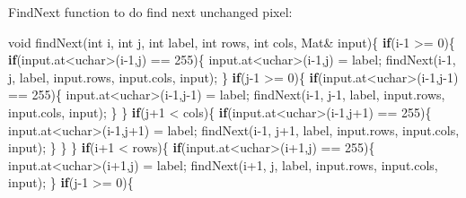 \documentclass[]{article}
\newenvironment{Shaded}{\begin{snugshade}}{\end{snugshade}}
\newcommand{\KeywordTok}[1]{\textcolor[rgb]{0.13,0.29,0.53}{\textbf{{#1}}}}
\newcommand{\DataTypeTok}[1]{\textcolor[rgb]{0.13,0.29,0.53}{{#1}}}
\newcommand{\DecValTok}[1]{\textcolor[rgb]{0.00,0.00,0.81}{{#1}}}
\newcommand{\NormalTok}[1]{{#1}}
\begin{document}
FindNext function to do find next unchanged pixel:

\begin{Shaded}
\begin{Highlighting}[]
\DataTypeTok{void} \NormalTok{findNext(}\DataTypeTok{int} \NormalTok{i, }\DataTypeTok{int} \NormalTok{j, }\DataTypeTok{int} \NormalTok{label, }\DataTypeTok{int} \NormalTok{rows, }\DataTypeTok{int} \NormalTok{cols, Mat& input)\{}
    \KeywordTok{if}\NormalTok{(i}\DecValTok{-1} \NormalTok{>= }\DecValTok{0}\NormalTok{)\{}
        \KeywordTok{if}\NormalTok{(input.at<}\DataTypeTok{uchar}\NormalTok{>(i}\DecValTok{-1}\NormalTok{,j) == }\DecValTok{255}\NormalTok{)\{}
            \NormalTok{input.at<}\DataTypeTok{uchar}\NormalTok{>(i}\DecValTok{-1}\NormalTok{,j) = label;}
            \NormalTok{findNext(i}\DecValTok{-1}\NormalTok{, j, label, input.rows, input.cols, input);}
        \NormalTok{\}}
        \KeywordTok{if}\NormalTok{(j}\DecValTok{-1} \NormalTok{>= }\DecValTok{0}\NormalTok{)\{}
            \KeywordTok{if}\NormalTok{(input.at<}\DataTypeTok{uchar}\NormalTok{>(i}\DecValTok{-1}\NormalTok{,j}\DecValTok{-1}\NormalTok{) == }\DecValTok{255}\NormalTok{)\{}
                \NormalTok{input.at<}\DataTypeTok{uchar}\NormalTok{>(i}\DecValTok{-1}\NormalTok{,j}\DecValTok{-1}\NormalTok{) = label;}
                \NormalTok{findNext(i}\DecValTok{-1}\NormalTok{, j}\DecValTok{-1}\NormalTok{, label, input.rows, input.cols, input);}
            \NormalTok{\}}
        \NormalTok{\}}
        \KeywordTok{if}\NormalTok{(j}\DecValTok{+1} \NormalTok{< cols)\{}
            \KeywordTok{if}\NormalTok{(input.at<}\DataTypeTok{uchar}\NormalTok{>(i}\DecValTok{-1}\NormalTok{,j}\DecValTok{+1}\NormalTok{) == }\DecValTok{255}\NormalTok{)\{}
                \NormalTok{input.at<}\DataTypeTok{uchar}\NormalTok{>(i}\DecValTok{-1}\NormalTok{,j}\DecValTok{+1}\NormalTok{) = label;}
                \NormalTok{findNext(i}\DecValTok{-1}\NormalTok{, j}\DecValTok{+1}\NormalTok{, label, input.rows, input.cols, input);}
            \NormalTok{\}}
        \NormalTok{\}}
    \NormalTok{\}}
    \KeywordTok{if}\NormalTok{(i}\DecValTok{+1} \NormalTok{< rows)\{}
        \KeywordTok{if}\NormalTok{(input.at<}\DataTypeTok{uchar}\NormalTok{>(i}\DecValTok{+1}\NormalTok{,j) == }\DecValTok{255}\NormalTok{)\{}
            \NormalTok{input.at<}\DataTypeTok{uchar}\NormalTok{>(i}\DecValTok{+1}\NormalTok{,j) = label;}
            \NormalTok{findNext(i}\DecValTok{+1}\NormalTok{, j, label, input.rows, input.cols, input);}
        \NormalTok{\}}
        \KeywordTok{if}\NormalTok{(j}\DecValTok{-1} \NormalTok{>= }\DecValTok{0}\NormalTok{)\{}

\end{Highlighting}
\end{Shaded}
\end{document}
